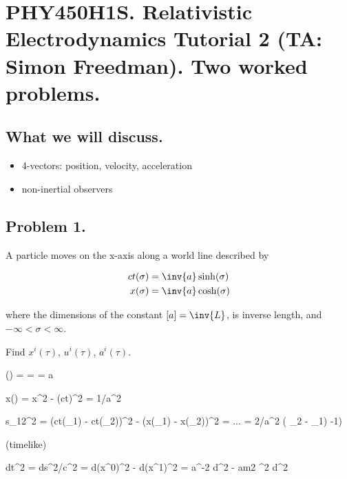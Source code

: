 
%

\chapter{PHY450H1S.  Relativistic Electrodynamics Tutorial 2 (TA: Simon Freedman).  Two worked problems.}
\label{chap:relativisticElectrodynamicsT2}
{}
\date{Jan 27, 2011}

\beginArtNoToc

\section{What we will discuss.}

\begin{itemize}
\item 4-vectors: position, velocity, acceleration
\item non-inertial observers
\end{itemize}

\section{Problem 1.}

A particle moves on the x-axis along a world line described by 

\begin{align}\label{eqn:relativisticElectrodynamicsT2:n}
ct(\sigma) &= \inv{a} \sinh(\sigma) \\
x(\sigma) &= \inv{a} \cosh(\sigma) 
\end{align}

where the dimensions of the constant $[a] = \inv{L}$, is inverse length, and $-\infty < \sigma < \infty$.

Find $x^i(\tau)$, $u^i(\tau)$, $a^i(\tau)$.

\cosh(\sigma) =  =  = a 

x(\sigma) =  \implies x^2 - (ct)^2 = 1/a^2

s_{12}^2 = (ct(\sigma_1) - ct(\sigma_2))^2 - (x(\sigma_1) - x(\sigma_2))^2 
= ... 
= 2/a^2 \cosh( \sigma_2 - \sigma_1) -1) 

(timelike)

dt^2 = ds^2/c^2 = d(x^0)^2 - d(x^1)^2 
= a^{-2}  \sigma d\sigma^2 - am2 \sinh^2 \sigma d\sigma^2

